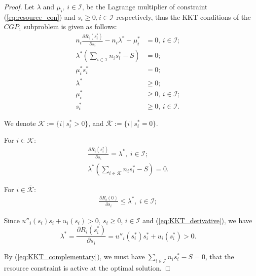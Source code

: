 \documentclass[twocolumn,10pt,twosided]{IEEEtran}
\begin{document}
\begin{proof}
Let $\lambda$ and $\mu_i$, $i\in\mathcal{I}$, be the Lagrange
multiplier of constraint (\ref{eq:resource_con}) and
$s_i\ge 0,i\in\mathcal{I}$ respectively, thus the KKT
conditions of the $CGP_1$ subproblem  is given as follows:
\begin{align*}
 n_i\frac{\partial R_i(s^*_i)}{\partial s_i}-n_i\lambda^*+\mu_i^*&=0, \, i\in\mathcal{I};\\
\lambda^*\left(\sum_{i\in\mathcal{I}}n_is_i^*-S\right)&=0;\\
\mu_i^*s_i^*&=0;\\
 \lambda^*&\ge 0;\\
 \mu_i^*&\ge 0,\, i\in\mathcal{I};\\
 s_i^*&\ge 0,\, i\in\mathcal{I}.
\end{align*}

We denote $\mathcal{K}:=\{i\,|\,s_i^*>0\}$, and
$\bar{\mathcal{K}}:=\{i\,|\,s_i^*=0\}$.

For $i\in \mathcal {K}$:
\begin{align}
 \frac{\partial R_i(s^*_i)}{\partial s_i}=\lambda^*,\; i\in\mathcal{I};\label{eq:KKT_derivative}\\
 \lambda^*\left(\sum_{i\in\mathcal{K}}n_is_i^*-S\right)=0. \label{eq:KKT_complementary}
\end{align}

For $i\in \bar{\mathcal {K}}$:
\begin{align}
 \frac{\partial R_i(0)}{\partial s_i}\le\lambda^*,\; i\in\mathcal{I};
\end{align}

Since $u''_i(s_i)s_i+u_i(s_i)>0$, $s_i\ge 0$, $i\in \mathcal{I}$ and
(\ref{eq:KKT_derivative}), we have
$$ \lambda^*=\frac{\partial R_i(s^*_i)}{\partial s_i}=u''_i(s^*_i)s^*_i+u_i(s^*_i)>0.$$

By (\ref{eq:KKT_complementary}), we must have
$\sum_{i\in\mathcal{I}}n_is_i^*-S=0$, that the resource constraint
is active at the optimal solution.
\end{proof}
\end{document}
